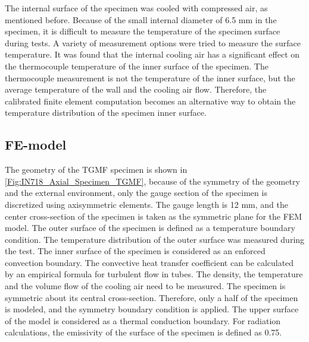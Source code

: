 \documentclass[preprint,5p,twocolumn,10pt,sort&compress]{elsarticle}
\begin{document}
The internal surface of the specimen was cooled with  compressed air, as mentioned before.
Because of the small internal diameter of 6.5 mm in the specimen, it is difficult to measure the temperature of the  specimen surface during tests. 
A variety of measurement options were tried to measure the  surface temperature.
It was found that the internal cooling air has a significant effect on the thermocouple temperature of the inner surface of the specimen.
The thermocouple measurement is not the temperature of the inner surface, but the average temperature of the wall and the cooling air flow.
Therefore, the calibrated finite element computation  becomes an alternative way to obtain the temperature distribution of the specimen inner surface.

\subsection{FE-model}

The geometry of the TGMF specimen is shown in \autoref{Fig:IN718_Axial_Specimen_TGMF}, because of the symmetry of the geometry and the external environment, only the gauge section of the specimen is discretized using axisymmetric  elements. The gauge length is 12 mm, and the center cross-section of the specimen is taken as the symmetric plane for the FEM model. 
The outer surface of the specimen is defined as a temperature boundary condition. The temperature distribution of the outer surface was measured during the test. The inner surface of the specimen is considered as an enforced convection boundary. The convective heat transfer coefficient can be calculated by an empirical formula for turbulent flow in tubes. The density, the temperature and the volume flow of the cooling air need to be measured. The specimen is symmetric about its central cross-section. Therefore, only a half of the specimen is modeled, and the symmetry boundary condition is applied.
The upper surface of the model is considered as a thermal conduction boundary. For radiation calculations, the emissivity of the surface of the specimen is defined as 0.75.

\end{document}
